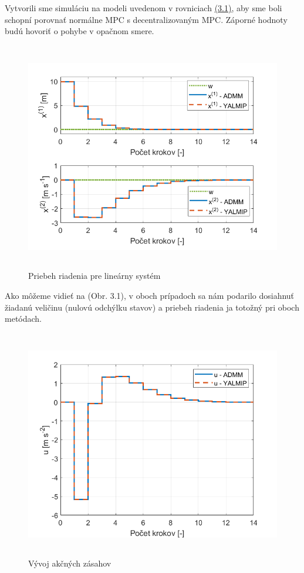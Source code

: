 Vytvorili sme simuláciu na modeli uvedenom v rovniciach \hyperref[math:model_HB]{(3.1)}, aby sme boli schopní porovnať normálne MPC s decentralizovaným MPC. Záporné hodnoty budú hovoriť o pohybe v opačnom smere. 
\begin{figure}[H]
	\centering
	\includegraphics[width=13cm,height=10cm]{images/Hmotny_bod/Priebeh_riadenia}
	\caption{Priebeh riadenia pre lineárny systém}
	\label{fig1: PRLS}
\end{figure}
Ako môžeme vidieť na (Obr. 3.1), v oboch prípadoch sa nám podarilo dosiahnuť žiadanú veličinu (nulovú odchýlku stavov) a priebeh riadenia ja totožný pri oboch metódach.
\newpage
\begin{figure}[H]
	\centering
	\includegraphics[width=13cm,height=10cm]{images/Hmotny_bod/Akcne_zasahy}
	\caption{Vývoj akčných zásahov}
	\label{fig2:AZLS}
\end{figure}

